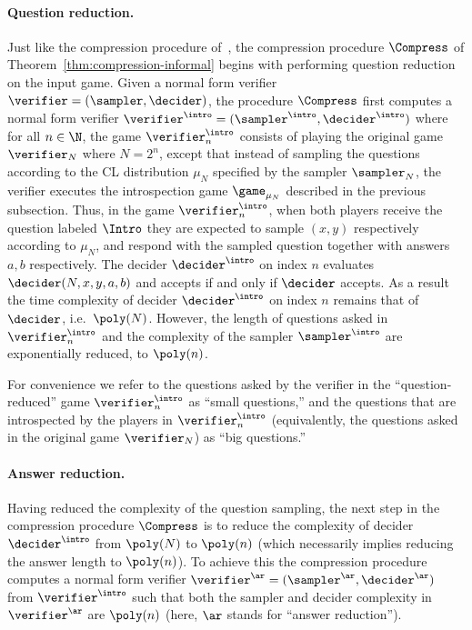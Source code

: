 \paragraph{Question reduction.} Just like the compression procedure of~\cite{NW19}, the compression procedure $\Compress$ of Theorem~\ref{thm:compression-informal} begins with performing question reduction on the input game. Given a normal form verifier $\verifier = (\sampler,\decider)$, the procedure $\Compress$ first computes a normal form verifier $\verifier^\intro = (\sampler^\intro,\decider^\intro)$ where for all $n \in \N$, the game $\verifier^\intro_n$ consists of playing the original game $\verifier_N$ where $N = 2^n$, except that instead of sampling the questions according to the CL distribution $\mu_N$ specified by the sampler $\sampler_N$, the verifier executes the introspection game $\game_{\mu_N}$  described in the previous subsection. Thus, in the game $\verifier^\intro_n$, when both players receive the question labeled $\Intro$ they are expected to sample $(x,y)$ respectively according to $\mu_N$, and respond with the sampled question together with answers $a,b$ respectively. The decider $\decider^\intro$ on index $n$ evaluates $\decider(N,x,y,a,b)$ and accepts if and only if $\decider$ accepts. As a result the time complexity of decider $\decider^\intro$ on index $n$ remains that of $\decider$, i.e.\ $\poly(N)$. However, the length of questions asked in $\verifier^\intro_n$ and the complexity of the sampler $\sampler^\intro$ are exponentially reduced, to $\poly(n)$.

For convenience we refer to the questions asked by the verifier in the ``question-reduced'' game $\verifier^\intro_n$ as ``small questions,'' and the questions that are introspected by the players in $\verifier^\intro_n$ (equivalently, the questions asked in the original game $\verifier_N$) as ``big questions.'' 

		
\paragraph{Answer reduction.} 
Having reduced the complexity of the question sampling, the next step in the compression procedure $\Compress$ is to reduce the complexity of decider $\decider^\intro$ from $\poly(N)$ to $\poly(n)$ (which necessarily implies reducing the answer length to $\poly(n)$). To achieve this the compression procedure computes a normal form verifier $\verifier^\ar = (\sampler^\ar,\decider^\ar)$ from $\verifier^\intro$ such that both the sampler and decider complexity in $\verifier^\ar$ are $\poly(n)$ (here, $\ar$ stands for ``answer reduction'').


